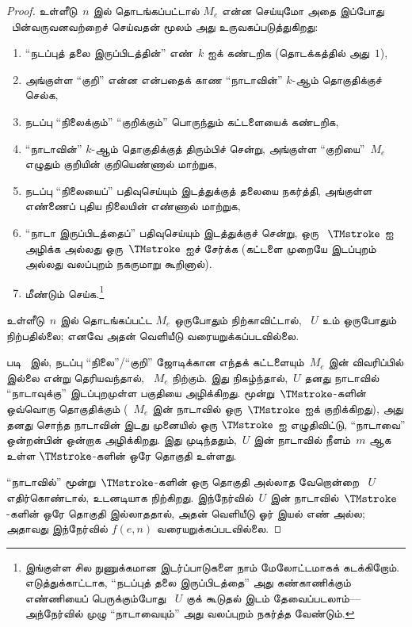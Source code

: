 \documentclass[../../../include/open-logic-section]{subfiles}
\begin{document}
\begin{proof}
  உள்ளீடு~$n$ இல் தொடங்கப்பட்டால் $M_e$ என்ன செய்யுமோ அதை இப்போது
  ~பின்வருவனவற்றைச் செய்வதன் மூலம் அது உருவகப்படுத்துகிறது:
  \begin{enumerate}
    \item ``நடப்புத் தலை இருப்பிடத்தின்'' எண்~$k$ ஐக் கண்டறிக
    (தொடக்கத்தில் அது~$1$),
    \item அங்குள்ள ``குறி'' என்ன என்பதைக் காண ``நாடாவின்''
    $k$-ஆம் தொகுதிக்குச் செல்க,
    \item{}%
    நடப்பு ``நிலைக்கும்'' ``குறிக்கும்'' பொருந்தும் கட்டளையைக் கண்டறிக,
    \item ``நாடாவின்'' $k$-ஆம் தொகுதிக்குத் திரும்பிச் சென்று, அங்குள்ள
    ``குறியை''~$M_e$ எழுதும் குறியின் குறியெண்ணால் மாற்றுக,
    \item நடப்பு ``நிலையைப்'' பதிவுசெய்யும் இடத்துக்குத் தலையை நகர்த்தி,
    அங்குள்ள எண்ணைப் புதிய நிலையின் எண்ணால் மாற்றுக,
    \item ``நாடா இருப்பிடத்தைப்'' பதிவுசெய்யும் இடத்துக்குச் சென்று, ஒரு
    ~$\TMstroke$ ஐ அழிக்க அல்லது ஒரு~$\TMstroke$ ஐச் சேர்க்க
    (கட்டளை முறையே இடப்புறம் அல்லது வலப்புறம் நகருமாறு கூறினால்).
    \item மீண்டும் செய்க.\footnote{இங்குள்ள சில நுணுக்கமான
    இடர்ப்பாடுகளை நாம் மேலோட்டமாகக் கடக்கிறோம். எடுத்துக்காட்டாக,
    ``நடப்புத் தலை இருப்பிடத்தை'' அது கண்காணிக்கும் எண்ணியைப் பெருக்கும்போது
    ~$U$ குக் கூடுதல் இடம் தேவைப்படலாம்---அந்நேர்வில் முழு ``நாடாவையும்''
    அது வலப்புறம் நகர்த்த வேண்டும்.}
  \end{enumerate}
  உள்ளீடு~$n$ இல் தொடங்கப்பட்ட $M_e$ ஒருபோதும் நிற்காவிட்டால்,
  ~$U$ உம் ஒருபோதும் நிற்பதில்லை; எனவே அதன் வெளியீடு
  வரையறுக்கப்படவில்லை.

  படி~ இல், நடப்பு ``நிலை''/``குறி'' ஜோடிக்கான
  எந்தக் கட்டளையும்~$M_e$ இன் விவரிப்பில் இல்லை என்று தெரியவந்தால்,
  ~$M_e$ நிற்கும். இது நிகழ்ந்தால்,~$U$ தனது நாடாவில் ``நாடாவுக்கு''
  இடப்புறமுள்ள பகுதியை அழிக்கிறது. மூன்று~$\TMstroke$-களின் ஒவ்வொரு
  தொகுதிக்கும் (~$M_e$ இன் நாடாவில் ஒரு~$\TMstroke$ ஐக் குறிக்கிறது),
  அது தனது சொந்த நாடாவின் இடது முனையில் ஒரு $\TMstroke$ ஐ எழுதிவிட்டு,
  ``நாடாவை'' ஒன்றன்பின் ஒன்றாக அழிக்கிறது. இது முடிந்ததும்,~$U$ இன்
  நாடாவில் நீளம்~$m$ ஆக உள்ள $\TMstroke$-களின் ஒரே தொகுதி உள்ளது.
  
  ``நாடாவில்'' மூன்று~$\TMstroke$-களின் ஒரு தொகுதி அல்லாத வேறொன்றை
  ~$U$ எதிர்கொண்டால், உடனடியாக நிற்கிறது. இந்நேர்வில்~$U$ இன்
  நாடாவில்~$\TMstroke$-களின் ஒரே தொகுதி இல்லாததால், அதன் வெளியீடு
  ஓர் இயல் எண் அல்ல; அதாவது இந்நேர்வில் $f(e,n)$
  வரையறுக்கப்படவில்லை.
\end{proof}
\end{document}
